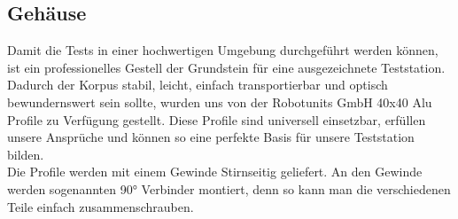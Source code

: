 \subsection{Gehäuse}\label{sec:Gehäuse}
Damit die Tests in einer hochwertigen Umgebung durchgeführt werden können, ist ein professionelles Gestell der Grundstein für eine ausgezeichnete Teststation. Dadurch der Korpus stabil, leicht, einfach transportierbar und optisch bewundernswert sein sollte, wurden uns von der Robotunits GmbH 40x40 Alu Profile\autocite{alu} zu Verfügung gestellt. Diese Profile sind universell einsetzbar, erfüllen unsere Ansprüche und können so eine perfekte Basis für unsere Teststation bilden. \\
\vspace{3mm}
Die Profile werden mit einem Gewinde Stirnseitig geliefert. An den Gewinde werden sogenannten 90° Verbinder\autocite{Verbinder} montiert, denn so kann man die verschiedenen Teile einfach zusammenschrauben.\\
\vspace{3mm}
